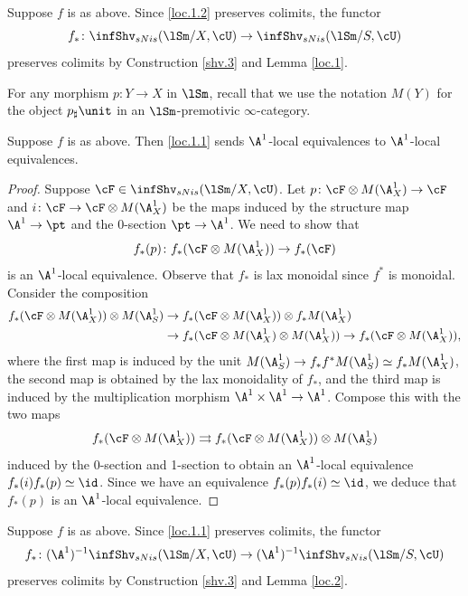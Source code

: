 \documentclass[10pt]{amsart}
\begin{document}
Suppose $f$ is as above.
Since \eqref{loc.1.2} preserves colimits, the functor
\begin{equation}
\label{loc.1.1}
f_*\colon \infShv_{sNis}(\lSm/X,\cU)\to \infShv_{sNis}(\lSm/S,\cU)
\end{equation}
preserves colimits by Construction \ref{shv.3} and Lemma \ref{loc.1}.

For any morphism $p\colon Y\to X$ in $\lSm$, recall that we use the notation $M(Y)$ for the object $p_\sharp \unit$ in an $\lSm$-premotivic $\infty$-category.

\begin{lem}
\label{loc.2}
Suppose $f$ is as above.
Then \eqref{loc.1.1} sends $\A^1$-local equivalences to $\A^1$-local equivalences.
\end{lem}
\begin{proof}
Suppose $\cF\in \infShv_{sNis}(\lSm/X,\cU)$.
Let $p\colon \cF\otimes M(\A_X^1)\to \cF$ and $i\colon \cF\to \cF\otimes M(\A_X^1)$ be the maps induced by the structure map $\A^1\to \pt$ and the $0$-section $\pt\to \A^1$.
We need to show that 
\[
f_*(p)\colon f_*(\cF\otimes M(\A_X^1))\to f_*(\cF)
\]
is an $\A^1$-local equivalence.
Observe that $f_*$ is lax monoidal since $f^*$ is monoidal.
Consider the composition
\begin{align*}
f_*(\cF\otimes M(\A_X^1))\otimes M(\A_S^1)
&\to
f_*(\cF\otimes M(\A_X^1))\otimes f_*M(\A_X^1)
\\
&\to
f_*(\cF\otimes M(\A_X^1)\otimes M(\A_X^1))
\to
f_*(\cF\otimes M(\A_X^1)),
\end{align*}
where the first map is induced by the unit $M(\A_S^1)\to f_*f^*M(\A_S^1)\simeq f_*M(\A_X^1)$, the second map is obtained by the lax monoidality of $f_*$, and the third map is induced by the multiplication morphism $\A^1\times \A^1\to \A^1$.
Compose this with the two maps
\[
f_*(\cF\otimes M(\A_X^1))\rightrightarrows f_*(\cF\otimes M(\A_X^1))\otimes M(\A_S^1)
\]
induced by the 0-section and 1-section to obtain an $\A^1$-local equivalence $f_*(i)f_*(p)\simeq \id$.
Since we have an equivalence $f_*(p)f_*(i)\simeq \id$, we deduce that $f_*(p)$ is an $\A^1$-local equivalence.
\end{proof}

Suppose $f$ is as above.
Since \eqref{loc.1.1} preserves colimits, the functor
\begin{equation}
\label{loc.2.1}
f_*\colon (\A^1)^{-1}\infShv_{sNis}(\lSm/X,\cU)\to (\A^1)^{-1}\infShv_{sNis}(\lSm/S,\cU)
\end{equation}
preserves colimits by Construction \ref{shv.3} and Lemma \ref{loc.2}.
\end{document}
